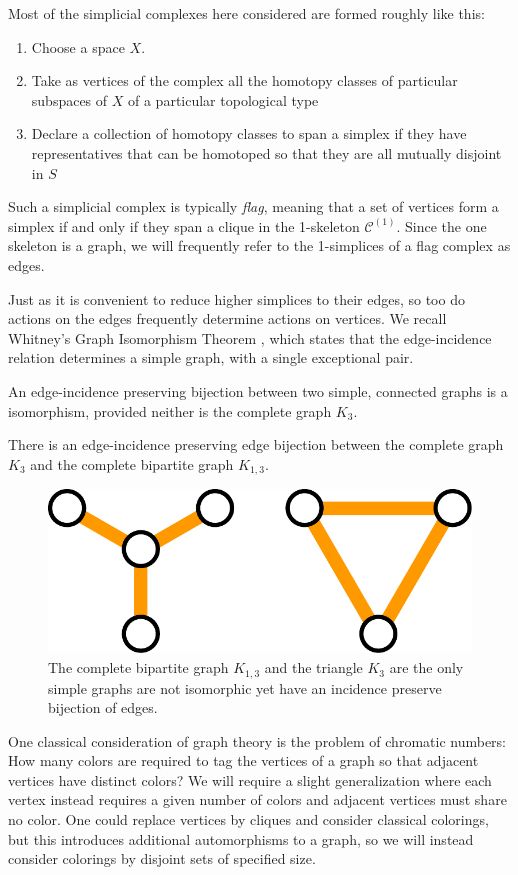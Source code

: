Most of the simplicial complexes here considered are formed roughly like this:
\begin{enumerate}
  \item Choose a space $X$.
  \item Take as vertices of the complex all the homotopy classes of particular subspaces of $X$ of a particular topological type
  \item Declare a collection of homotopy classes to span a simplex if they have representatives that can be homotoped so that they are all mutually disjoint in $S$
\end{enumerate}
Such a simplicial complex is typically \emph{flag},
meaning that a set of vertices form a simplex if and only if they span a clique in the 1-skeleton $\mathcal C^{(1)}$. Since the one skeleton is a graph, we will frequently refer to the 1-simplices of a flag complex as edges.

Just as it is convenient to reduce higher simplices to their edges,
so too do actions on the edges frequently determine actions on vertices.
We recall Whitney's Graph Isomorphism Theorem
\cite{MR1506881}, which
states that the edge-incidence relation determines a simple graph,
with a single exceptional pair.

\begin{theorem}
  An edge-incidence preserving bijection between two simple, connected graphs
  is a isomorphism, provided neither is the complete graph $K_3$.

  There is an edge-incidence preserving edge bijection between the complete
  graph $K_3$ and the complete bipartite graph $K_{1,3}$.
  \label{thm:whitney}
\end{theorem}

\begin{figure}[h!]
  \centering
  \includegraphics[width=.5\textwidth]{figures/graphexamples.pdf}
  \caption{
  The complete bipartite graph $K_{1,3}$ and the triangle $K_3$ are the only simple graphs
  are not isomorphic yet have an incidence preserve bijection of edges.
  }
  \label{fig:graphexamples}
\end{figure}

One classical consideration of graph theory
is the problem of chromatic numbers:
How many colors are required to
tag the vertices of a graph so that adjacent vertices have distinct colors?
We will require a slight generalization where each vertex instead requires a given number of colors and adjacent vertices must share no color.
One could replace vertices by cliques and consider classical colorings,
but this introduces additional automorphisms to a graph, so we will instead consider colorings by disjoint sets of specified size.


